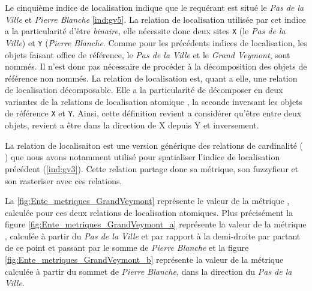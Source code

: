 Le cinquième indice de localisation indique que le requérant est situé
 le \emph{Pas de la Ville} et \emph{Pierre
  Blanche} \ref{ind:gv5}. La relation de localisation utilisée par cet
indice a la particularité d'être \emph{binaire,} elle nécessite donc
deux sites \texttt{X} (le \emph{Pas de la Ville}) et \texttt{Y}
(\emph{Pierre Blanche}. Comme pour les précédents indices de
localisation, les objets faisant office de référence, le \emph{Pas de
  la Ville} et le \emph{Grand Veymont}, sont nommés. Il n'est donc pas
nécessaire de procéder à la décomposition des objets de référence non
nommés. La relation de localisation  est,
quant a elle, une relation de localisation décomposable. Elle a la
particularité de décomposer en deux variantes de la relations de
localisation atomique , la
seconde inversant les objets de référence \texttt{X} et
\texttt{Y}. Ainsi, cette définition revient a considérer qu'être entre
deux objets, revient a être dans la direction de X depuis Y et
inversement.

La relation de localisaiton  est
une version générique des relations de cardinalité (\eg
{}) que nous avons notamment utilisé pour
spatialiser l'indice de localisation précédent (\ref{ind:gv3}).
%
Cette relation partage donc sa métrique, son fuzzyfieur et son
rasteriser avec ces relations.

La \autoref{fig:Ente_metriques_GrandVeymont} représente le valeur de
la métrique , calculée pour ces deux
relations de localisation atomiques. Plus précisément la figure
\ref{fig:Ente_metriques_GrandVeymont_a} représente la valeur de la
métrique , calculée à partir du \emph{Pas
  de la Ville} et par rapport à la demi-droite par partant de ce point
et passant par le somme de \emph{Pierre Blanche} et la figure
\ref{fig:Ente_metriques_GrandVeymont_b} représente la valeur de la
métrique  calculée à partir du sommet de
\emph{Pierre Blanche,} dans la direction du \emph{Pas de la Ville.}

